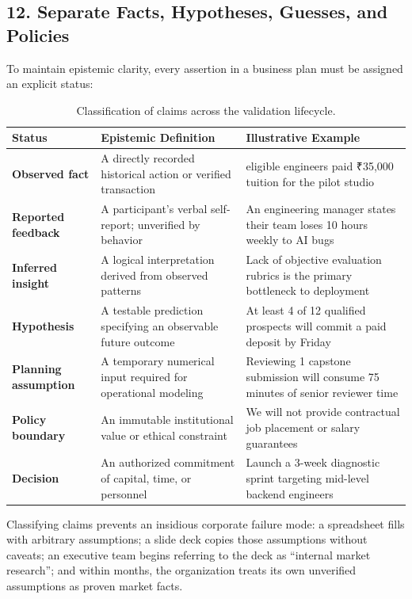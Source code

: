 \subsection*{12. Separate Facts, Hypotheses, Guesses, and Policies}

To maintain epistemic clarity, every assertion in a business plan must be assigned an explicit status:

\begin{table}[t]
\centering
\small
\begin{tabularx}{\textwidth}{>{\raggedright\arraybackslash}p{3.5cm} >{\raggedright\arraybackslash}X >{\raggedright\arraybackslash}X}
\toprule
\textbf{Status} & \textbf{Epistemic Definition} & \textbf{Illustrative Example} \\
\midrule
\textbf{Observed fact} & A directly recorded historical action or verified transaction & 8 eligible engineers paid ₹35,000 tuition for the pilot studio \\
\textbf{Reported feedback} & A participant's verbal self-report; unverified by behavior & An engineering manager states their team loses 10 hours weekly to AI bugs \\
\textbf{Inferred insight} & A logical interpretation derived from observed patterns & Lack of objective evaluation rubrics is the primary bottleneck to deployment \\
\textbf{Hypothesis} & A testable prediction specifying an observable future outcome & At least 4 of 12 qualified prospects will commit a paid deposit by Friday \\
\textbf{Planning assumption} & A temporary numerical input required for operational modeling & Reviewing 1 capstone submission will consume 75 minutes of senior reviewer time \\
\textbf{Policy boundary} & An immutable institutional value or ethical constraint & We will not provide contractual job placement or salary guarantees \\
\textbf{Decision} & An authorized commitment of capital, time, or personnel & Launch a 3-week diagnostic sprint targeting mid-level backend engineers \\
\bottomrule
\end{tabularx}
\caption{Classification of claims across the validation lifecycle.}
\label{tab:ch9-evidence-status}
\end{table}

Classifying claims prevents an insidious corporate failure mode: a spreadsheet fills with arbitrary assumptions; a slide deck copies those assumptions without caveats; an executive team begins referring to the deck as ``internal market research''; and within months, the organization treats its own unverified assumptions as proven market facts.

